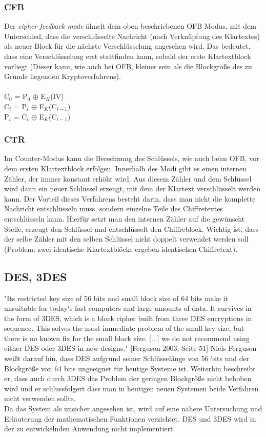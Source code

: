 \documentclass[10pt, a4paper]{scrreprt}
\begin{document}
\subsubsection{CFB}
Der \textit{cipher feedback mode} ähnelt dem oben beschriebenen OFB Modus, mit dem Unterschied, dass die verschlüsselte Nachricht (nach Verknüpfung des Klartextes) als neuer Block für die nächste Verschlüsselung angesehen wird. Das bedeutet, dass eine Verschlüsselung erst stattfinden kann, sobald der erste Klartextblock vorliegt (Dieser kann, wie auch bei OFB, kleiner sein als die Blockgröße des zu Grunde liegenden Kryptoverfahrens). \\ \\
C$_{0}$ = P$_{0}$ $\oplus$ E$_{K}$(IV) \\
C$_{i}$ = P$_{i}$ $\oplus$ E$_{K}$(C$_{i-1}$) \\
P$_{i}$ = C$_{i}$ $\oplus$ E$_{K}$(C$_{i-1}$) \\

\subsubsection{CTR}
Im Counter-Modus kann die Berechnung des Schlüssels, wie auch beim OFB, vor dem ersten Klartextblock erfolgen. Innerhalb des Modi gibt es einen internen Zähler, der immer konstant erhöht wird. Aus diesem Zähler und dem Schlüssel wird dann ein neuer Schlüssel erzeugt, mit dem der Klartext verschlüsselt werden kann. Der Vorteil dieses Verfahrens besteht darin, dass man nicht die komplette Nachricht entschlüsseln muss, sondern einzelne Teile des Chiffretextes entschlüsseln kann. Hierfür setzt man den internen Zähler auf die gewünscht Stelle, erzeugt den Schlüssel und entschlüsselt den Chiffreblock. Wichtig ist, dass der selbe Zähler mit den selben Schlüssel nicht doppelt verwendet werden soll (Problem: zwei identische Klartextblöcke ergeben identischen Chiffretext).

\subsection{DES, 3DES}
"Its restricted key size of 56 bits and small block size of 64 bits make it unsuitable for today`s fast computers and large amounts of data. It survives in the form of 3DES, which is a block cipher built from three DES encryptions in sequence. This solves the most immediate problem of the small key size, but there is no known fix for the small block size. [...] we do not recommend using either DES oder 3DES in new designs." [Ferguson 2003, Seite 51]
Niels Ferguson weißt darauf hin, dass DES aufgrund seiner Schlüsselänge von 56 bits und der Blockgröße von 64 bits ungeeignet für heutige Systeme ist. Weiterhin beschreibt er, dass auch durch 3DES das Problem der geringen Blockgröße nicht behoben wird und er schlussfolgert dass man in heutigen neuen Systemen beide Verfahren nicht verwenden sollte. \\
Da das System als unsicher angesehen ist, wird auf eine nähere Untersuchung und Erläuterung der mathematischen Funktionen verzichtet. DES und 3DES wird in der zu entwickelnden Anwendung nicht implementiert.
\end{document}
